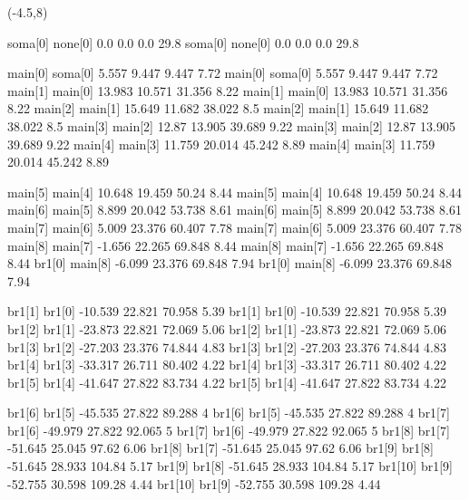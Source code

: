     (-4.5,8)

soma[0]    none[0]    0.0    0.0    0.0    29.8
soma[0]    none[0]    0.0    0.0    0.0    29.8


main[0]    soma[0]    5.557    9.447    9.447    7.72
main[0]    soma[0]    5.557    9.447    9.447    7.72
main[1]    main[0]    13.983    10.571    31.356    8.22
main[1]    main[0]    13.983    10.571    31.356    8.22
main[2]    main[1]    15.649    11.682    38.022    8.5
main[2]    main[1]    15.649    11.682    38.022    8.5
main[3]    main[2]    12.87    13.905    39.689    9.22
main[3]    main[2]    12.87    13.905    39.689    9.22
main[4]    main[3]    11.759    20.014    45.242    8.89
main[4]    main[3]    11.759    20.014    45.242    8.89


main[5]    main[4]    10.648    19.459    50.24    8.44
main[5]    main[4]    10.648    19.459    50.24    8.44
main[6]    main[5]    8.899    20.042    53.738    8.61
main[6]    main[5]    8.899    20.042    53.738    8.61
main[7]    main[6]    5.009    23.376    60.407    7.78
main[7]    main[6]    5.009    23.376    60.407    7.78
main[8]    main[7]    -1.656    22.265    69.848    8.44
main[8]    main[7]    -1.656    22.265    69.848    8.44
br1[0]    main[8]    -6.099    23.376    69.848    7.94
br1[0]    main[8]    -6.099    23.376    69.848    7.94


br1[1]    br1[0]    -10.539    22.821    70.958    5.39
br1[1]    br1[0]    -10.539    22.821    70.958    5.39
br1[2]    br1[1]    -23.873    22.821    72.069    5.06
br1[2]    br1[1]    -23.873    22.821    72.069    5.06
br1[3]    br1[2]    -27.203    23.376    74.844    4.83
br1[3]    br1[2]    -27.203    23.376    74.844    4.83
br1[4]    br1[3]    -33.317    26.711    80.402    4.22
br1[4]    br1[3]    -33.317    26.711    80.402    4.22
br1[5]    br1[4]    -41.647    27.822    83.734    4.22
br1[5]    br1[4]    -41.647    27.822    83.734    4.22


br1[6]    br1[5]    -45.535    27.822    89.288    4
br1[6]    br1[5]    -45.535    27.822    89.288    4
br1[7]    br1[6]    -49.979    27.822    92.065    5
br1[7]    br1[6]    -49.979    27.822    92.065    5
br1[8]    br1[7]    -51.645    25.045    97.62    6.06
br1[8]    br1[7]    -51.645    25.045    97.62    6.06
br1[9]    br1[8]    -51.645    28.933    104.84    5.17
br1[9]    br1[8]    -51.645    28.933    104.84    5.17
br1[10]    br1[9]    -52.755    30.598    109.28    4.44
br1[10]    br1[9]    -52.755    30.598    109.28    4.44


